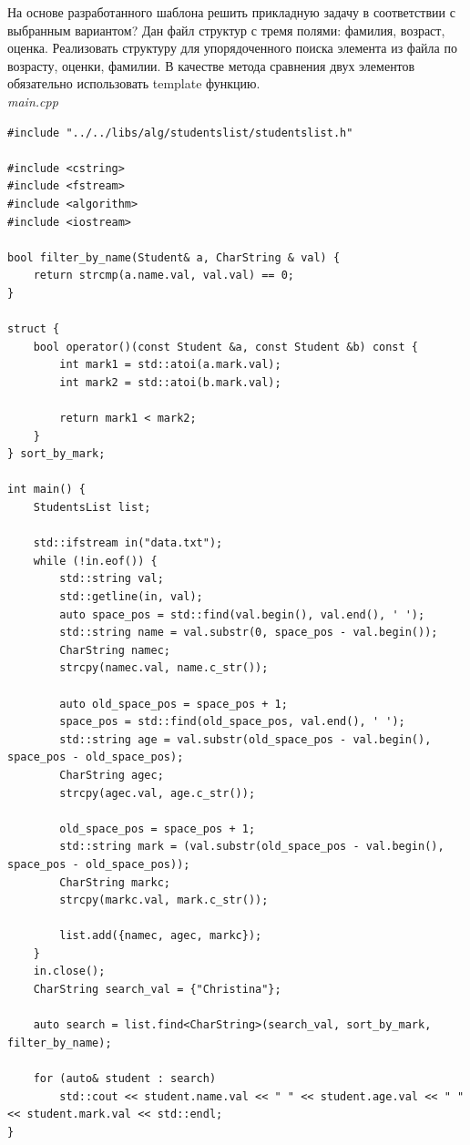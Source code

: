 \documentclass[a4paper,14pt]{extarticle}
\begin{document}
На основе разработанного шаблона решить прикладную задачу в соответствии с
выбранным вариантом? Дан файл структур с тремя полями: фамилия, возраст, оценка. Реализовать структуру для
упорядоченного поиска элемента из файла по возрасту, оценки, фамилии. В качестве метода
сравнения двух элементов обязательно использовать template функцию.\\
\textit{main.cpp}
\begin{verbatim}
#include "../../libs/alg/studentslist/studentslist.h"

#include <cstring>
#include <fstream>
#include <algorithm>
#include <iostream>

bool filter_by_name(Student& a, CharString & val) {
    return strcmp(a.name.val, val.val) == 0;
}

struct {
    bool operator()(const Student &a, const Student &b) const {
        int mark1 = std::atoi(a.mark.val);
        int mark2 = std::atoi(b.mark.val);

        return mark1 < mark2;
    }
} sort_by_mark;

int main() {
    StudentsList list;

    std::ifstream in("data.txt");
    while (!in.eof()) {
        std::string val;
        std::getline(in, val);
        auto space_pos = std::find(val.begin(), val.end(), ' ');
        std::string name = val.substr(0, space_pos - val.begin());
        CharString namec;
        strcpy(namec.val, name.c_str());

        auto old_space_pos = space_pos + 1;
        space_pos = std::find(old_space_pos, val.end(), ' ');
        std::string age = val.substr(old_space_pos - val.begin(), space_pos - old_space_pos);
        CharString agec;
        strcpy(agec.val, age.c_str());

        old_space_pos = space_pos + 1;
        std::string mark = (val.substr(old_space_pos - val.begin(), space_pos - old_space_pos));
        CharString markc;
        strcpy(markc.val, mark.c_str());

        list.add({namec, agec, markc});
    }
    in.close();
    CharString search_val = {"Christina"};

    auto search = list.find<CharString>(search_val, sort_by_mark, filter_by_name);

    for (auto& student : search)
        std::cout << student.name.val << " " << student.age.val << " " << student.mark.val << std::endl;
}
\end{verbatim}
\end{document}
